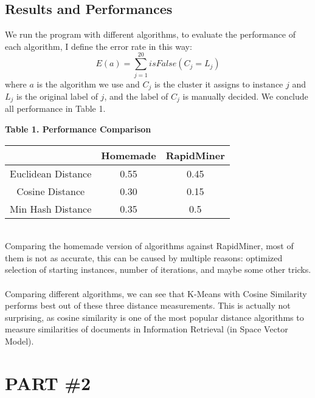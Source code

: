 \documentclass[12pt]{article}
\begin{document}
\subsection*{Results and Performances}
We run the program with different algorithms, to evaluate the performance of each algorithm, I define the error rate in this way:
$$E(a) = \sum_{j=1}^{20} isFalse(C_j=L_j)$$
where $a$ is the algorithm we use and $C_j$ is the cluster it assigns to instance $j$ and $L_j$ is the original label of $j$, and the label of $C_j$ is manually decided. We conclude all performance in Table 1.
\begin{center}
  \textbf{Table 1. Performance Comparison}\\
  \begin{tabular}{| c | c | c |}
    \hline
       & Homemade & RapidMiner \\ \hline
    Euclidean Distance & 0.55 & 0.45 \\ \hline
    Cosine Distance & 0.30 & 0.15 \\ \hline
    Min Hash Distance & 0.35 & 0.5 \\
    \hline
  \end{tabular}
\end{center}
\mbox{}\\
Comparing the homemade version of algorithms against RapidMiner, most of them is not as accurate, this can be caused by multiple reasons: optimized selection of starting instances, number of iterations, and maybe some other tricks.\\
\\
Comparing different algorithms, we can see that K-Means with Cosine Similarity performs best out of these three distance measurements. This is actually not surprising, as cosine similarity is one of the most popular distance algorithms to measure similarities of documents in Information Retrieval (in Space Vector Model). \\
\section*{PART \#2}
\end{document}
